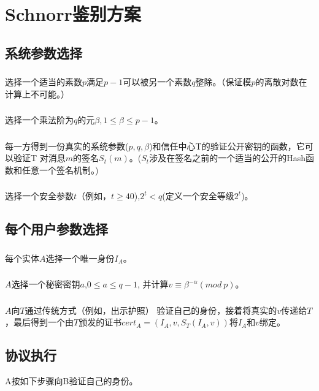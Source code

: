 \documentclass[11pt,a4paper]{article}
\begin{document}
\section{Schnorr鉴别方案}

\subsection{系统参数选择}
\subsubsection{}选择一个适当的素数$p$满足$p-1$可以被另一个素数$q$整除。（保证模$p$的离散对数在计算上不可能。）
\subsubsection{}选择一个乘法阶为$q$的元$\beta, 1\le \beta \le p-1$。
\subsubsection{}每一方得到一份真实的系统参数($p,q,\beta$)和信任中心T的验证公开密钥的函数，它可以验证T 对消息$m$的签名$S_t(m)$。($S_t$涉及在签名之前的一个适当的公开的Hash函数和任意一个签名机制。)
\subsubsection{}选择一个安全参数$t$（例如，$t \ge40$),$2^t < q$(定义一个安全等级$2^t$)。

\subsection{每个用户参数选择}
\subsubsection{}每个实体$A$选择一个唯一身份$I_A$。
\subsubsection{}$A$选择一个秘密密钥$a$,$0 \le a \le q-1$, 并计算$v \equiv \beta^{-\alpha} (mod\ p)$。
\subsubsection{}$A$向$T$通过传统方式（例如，出示护照） 验证自己的身份，接着将真实的$v$传递给$T$，最后得到一个由$T$颁发的证书$cert_A=(I_A,v,S_T(I_A,v))$将$I_A$和$v$绑定。

\subsection{协议执行} A按如下步骤向B验证自己的身份。
\end{document}
